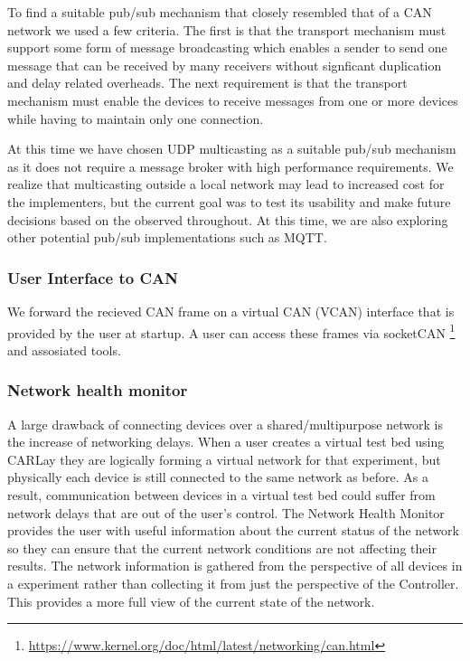 \documentclass[letterpaper,twocolumn,12pt]{article}
\begin{document}
To find a suitable pub/sub mechanism that closely resembled that of a CAN network we used a few criteria. The first is that the transport mechanism must support some form of message broadcasting which enables a sender to send one message that can be received by many receivers without signficant duplication and delay related overheads. The next requirement is that the transport mechanism must enable the devices to receive messages from one or more devices while having to maintain only one connection. 

At this time we have chosen UDP multicasting as a suitable pub/sub mechanism as it does not require a message broker with high performance requirements. We realize that multicasting outside a local network may lead to increased cost for the implementers, but the current goal was to test its usability and make future decisions based on the observed throughout. At this time, we are also exploring other potential pub/sub implementations such as MQTT.

\subsubsection{User Interface to CAN}
We forward the recieved CAN frame on a virtual CAN (VCAN) interface that is provided by the user at startup. A user can access these frames via socketCAN \footnote{\url{https://www.kernel.org/doc/html/latest/networking/can.html}} and assosiated tools.


\subsubsection{Network health monitor}
A large drawback of connecting devices over a shared/multipurpose network is the increase of networking delays. When a user creates a virtual test bed using CARLay they are logically forming a virtual network for that experiment, but physically each device is still connected to the same network as before. As a result, communication between devices in a virtual test bed could suffer from network delays that are out of the user’s control. The Network Health Monitor provides the user with useful information about the current status of the network so they can ensure that the current network conditions are not affecting their results. The network information is gathered from the perspective of all devices in a experiment rather than collecting it from just the perspective of the Controller. This provides a more full view of the current state of the network.
\end{document}
